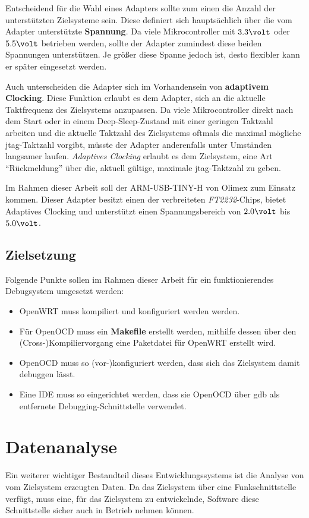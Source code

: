 Entscheidend für die Wahl eines Adapters sollte zum einen die Anzahl der
unterstützten Zielsysteme sein. Diese definiert sich hauptsächlich über die
vom Adapter unterstützte \textbf{Spannung}. Da viele Mikrocontroller mit
$3.3\volt$ oder $5.5\volt$ betrieben werden, sollte der Adapter zumindest diese beiden
Spannungen unterstützen. Je größer diese Spanne jedoch ist, desto flexibler kann
er später eingesetzt werden.

Auch unterscheiden die Adapter sich im Vorhandensein von \textbf{adaptivem
Clocking}. Diese Funktion erlaubt es dem Adapter, sich an die aktuelle
Taktfrequenz des Zielsystems anzupassen. Da viele Mikrocontroller direkt nach
dem Start oder in einem Deep-Sleep-Zustand mit einer geringen Taktzahl arbeiten
und die aktuelle Taktzahl des Zielsystems oftmals die maximal mögliche
\gls{jtag}-Taktzahl vorgibt, müsste der Adapter anderenfalls unter Umständen langsamer
laufen. \emph{Adaptives Clocking} erlaubt es dem Zielsystem, eine Art
"`Rückmeldung"' über die, aktuell gültige, maximale \gls{jtag}-Taktzahl zu geben.

Im Rahmen dieser Arbeit soll der ARM-USB-TINY-H von Olimex zum Einsatz kommen.
Dieser Adapter besitzt einen der verbreiteten \emph{FT2232}-Chips, bietet
Adaptives Clocking und unterstützt einen Spannungsbereich von $2.0\volt$ bis
$5.0\volt$.

\subsection{Zielsetzung}
\begin{minipage}[c]{\textwidth}
Folgende Punkte sollen im Rahmen dieser Arbeit für ein funktionierendes
Debugsystem umgesetzt werden:
\begin{itemize}
  \item OpenWRT muss kompiliert und konfiguriert werden werden.
  \item Für OpenOCD muss ein \textbf{Makefile} erstellt werden, mithilfe
  dessen über den \linebreak(Cross-)Kompiliervorgang eine Paketdatei für
  OpenWRT erstellt wird.
  \item OpenOCD muss so (vor-)konfiguriert werden, dass sich das Zielsystem
  damit debuggen lässt.
  \item Eine IDE muss so eingerichtet werden, dass sie OpenOCD über \gls{gdb}
  als entfernete Debugging-Schnittstelle verwendet.
\end{itemize}
\end{minipage}
\section{Datenanalyse}\label{sec:datenan}
Ein weiterer wichtiger Bestandteil dieses Entwicklungssystems ist die Analyse
von vom Zielsystem erzeugten Daten. Da das Zielsystem über eine
Funkschnittstelle verfügt, muss eine, für das Zielsystem zu entwickelnde,
Software diese Schnittstelle sicher auch in Betrieb nehmen können.

